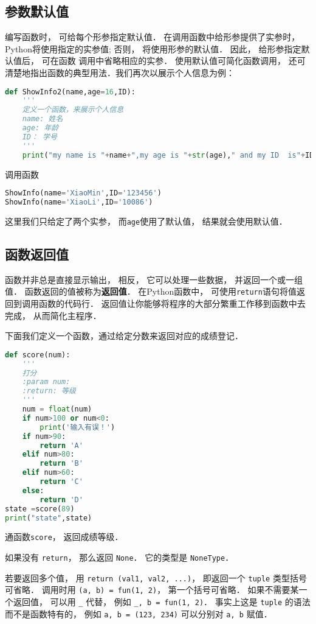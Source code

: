 \subsection{参数默认值}
编写函数时， 可给每个形参指定默认值． 在调用函数中给形参提供了实参时， Python将使用指定的实参值; 否则， 将使用形参的默认值． 因此， 给形参指定默认值后， 可在函数
调用中省略相应的实参． 使用默认值可简化函数调用， 还可清楚地指出函数的典型用法．我们再次以展示个人信息为例：
\begin{lstlisting}[language=python]
def ShowInfo2(name,age=16,ID):
    '''
    定义一个函数，来展示个人信息
    name: 姓名
    age: 年龄
    ID： 学号
    '''
    print("my name is "+name+",my age is "+str(age)," and my ID  is"+ID)
\end{lstlisting}
调用函数
\begin{lstlisting}[language=python]
ShowInfo(name='XiaoMin',ID='123456')
ShowInfo(name='XiaoLi',ID='10086')
\end{lstlisting}
这里我们只给定了两个实参， 而\verb|age|使用了默认值， 结果就会使用默认值．

\subsection{函数返回值}
函数并非总是直接显示输出， 相反， 它可以处理一些数据， 并返回一个或一组值． 函数返回的值被称为\textbf{返回值}． 在Python函数中， 可使用\verb|return|语句将值返回到调用函数的代码行． 返回值让你能够将程序的大部分繁重工作移到函数中去完成， 从而简化主程序．

下面我们定义一个函数，通过给定分数来返回对应的成绩登记．
\begin{lstlisting}[language=python]
def score(num):
    '''
    打分
    :param num:
    :return: 等级
    '''
    num = float(num)
    if num>100 or num<0:
        print('输入有误！')
    if num>90:
        return 'A'
    elif num>80:
        return 'B'
    elif num>60:
        return 'C'
    else:
        return 'D'
state =score(89)
print("state",state)
\end{lstlisting}
通函数\verb|score|， 返回成绩等级．

如果没有 \verb|return|， 那么返回 \verb|None|． 它的类型是 \verb|NoneType|．

若要返回多个值， 用 \verb|return (val1, val2, ...)|， 即返回一个 \verb|tuple| 类型括号可省略． 调用时用 \verb|(a, b) = fun(1, 2)|， 第一个括号可省略． 如果不需要某一个返回值， 可以用 \verb|_| 代替， 例如 \verb|_, b = fun(1, 2)|． 事实上这是 \verb|tuple| 的语法而不是函数特有的， 例如 \verb|a, b = (123, 234)| 可以分别对 \verb|a, b| 赋值．

